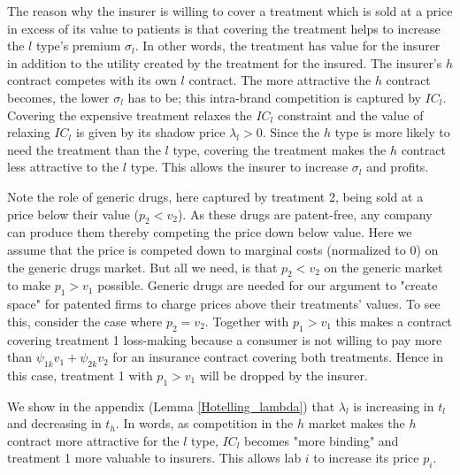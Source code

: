 \documentclass[a4paper,12pt]{article}
\begin{document}
The reason why the insurer is willing to cover a treatment which is sold at a price in excess of its value to patients is that covering the treatment helps to increase the \(l\) type's premium \(\sigma_{l}\). In other words, the treatment has value for the insurer in addition to the utility created by the treatment for the insured. The insurer's \(h\) contract competes with its own \(l\) contract. The more attractive the \(h\) contract becomes, the lower \(\sigma_{l}\) has to be; this intra-brand competition is captured by \(IC_{l}\). Covering the expensive treatment relaxes the \(IC_l\) constraint and the value of relaxing \(IC_l\) is given by its shadow price \(\lambda_l > 0\). Since the \(h\) type is more likely to need the treatment than the \(l\) type, covering the treatment makes the \(h\) contract less attractive to the \(l\) type. This allows the insurer to increase \(\sigma_l\) and profits.

Note the role of generic drugs, here captured by treatment 2, being sold at a price below their value (\(p_2 < v_2\)). As these drugs are patent-free, any company can produce them thereby competing the price down below value. Here we assume that the price is competed down to marginal costs (normalized to 0) on the generic drugs market. But all we need, is that \(p_2 < v_2\) on the generic market to make \(p_1>v_1\) possible. Generic drugs are needed for our argument to "create space" for patented firms to charge prices above their treatments' values. To see this, consider the case where \(p_2=v_2\). Together with \(p_1>v_1\) this makes a contract covering treatment 1 loss-making because a consumer is not willing to pay more than \(\psi_{1k} v_1 + \psi_{2k} v_2\) for an insurance contract covering both treatments. Hence in this case, treatment 1 with \(p_1>v_1\) will be dropped by the insurer.

We show in the appendix (Lemma \ref{Hotelling_lambda}) that \(\lambda_l\) is increasing in \(t_l\) and decreasing in \(t_h\). In words, as competition in the \(h\) market makes the \(h\) contract more attractive for the \(l\) type, \(IC_l\) becomes "more binding" and treatment 1 more valuable to insurers. This allows lab \(i\) to increase its price \(p_i\).
\end{document}
